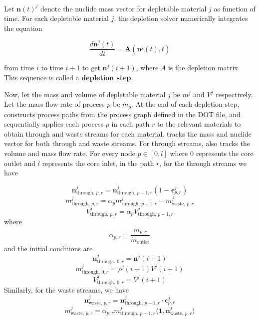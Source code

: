 Let $\mathbf{n}(t)^{j}$ denote the nuclide mass vector for depletable material
$j$ as function of time. For each depletable material $j$, the depletion
solver numerically integrates the equation

\begin{equation}
    \frac{d\mathbf{n}^{j}(t)}{dt} = \mathbf{A}(\mathbf{n}^{j}(t), t)
\end{equation}

from time $i$ to time $i+1$ to get $\mathbf{n}^{j}(i+1)$, where $A$ is the
depletion matrix. This sequence is called a {\bf depletion step}.

Now, let the mass and volume of depletable material $j$ be
$m^{j}$ and $V^{j}$ respectively. Let the mass flow rate of process $p$ be
$\dot{m}_{p}$. At the end of each depletion step, \SaltProc constructs process
paths from the process graph defined in the DOT file, and sequentially applies
each process $p$ in each path $r$ to the relevant materials to obtain through
and waste streams for each material. \SaltProc tracks the mass and nuclide vector for both through and waste streams. For through
streams, \SaltProc also tracks the volume and mass flow rate. For every node
$p\in[0,l]$ where $0$ represents the core outlet and $l$ represents the core
inlet, in the path $r$, for the through streams we have

\begin{equation}
    \mathbf{n}^{j}_{\text{through, }p,r} = \mathbf{n}^{j}_{\text{through, }p-1,r} (1 - \pmb{\epsilon}^{j}_{p,r})
\end{equation}
\begin{equation}
    m^{j}_{\text{through, } p,r} = \alpha_{p} m^{j}_{\text{through, }p-1,r} - m^{j}_{\text{waste, }p,r}
\end{equation}
\begin{equation}
    V^{j}_{\text{through, }p,r} = \alpha_{p}V^{j}_{\text{through, }p-1,r}
\end{equation}
where 
\begin{equation}
    \alpha_{p,r} = \frac{\dot{m}_{p,r}}{\dot{m}_{\text{outlet}}}
\end{equation}
and the initial conditions are 
\begin{equation}
    \mathbf{n}^{j}_{\text{through, }0,r} = \mathbf{n}^{j}(i+1)
\end{equation}
\begin{equation}
    m^{j}_{\text{through, }0,r} = \rho^{j}(i+1)V^{j}(i+1)
\end{equation}
\begin{equation}
    V^{j}_{\text{through, }0,r} = V^{j}(i+1)
\end{equation}
Similarly, for the waste streams, we have
\begin{equation}
    \mathbf{n}^{j}_{\text{waste, }p,r} = \mathbf{n}^{j}_{\text{through, }p-1,r} \cdot \pmb{\epsilon}^{j}_{p,r}
\end{equation}
\begin{equation}
    m^{j}_{\text{waste, }p,r} = \alpha_{p,r} m^{j}_{\text{through, }p-1,r} \langle\mathbf{1},\mathbf{n}^{j}_{\text{waste, }p,r}\rangle
\end{equation}

